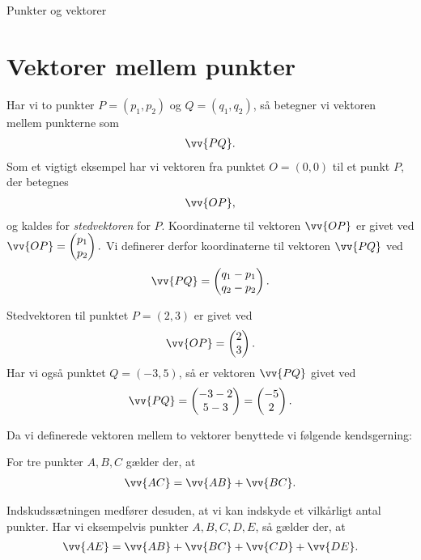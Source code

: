\begin{center}
\Huge
Punkter og vektorer
\end{center}

\section*{Vektorer mellem punkter}
\begin{defn}
Har vi to punkter $P = (p_1,p_2)$ og $Q = (q_1,q_2)$, så betegner vi vektoren mellem punkterne som
\begin{align*}
\vv{PQ}.
\end{align*}
Som et vigtigt eksempel har vi vektoren fra punktet $O = (0,0)$ til et punkt $P$, der betegnes 
\begin{align*}
\vv{OP},
\end{align*}
og kaldes for \textit{stedvektoren} for $P$. 
Koordinaterne til vektoren $\vv{OP}$ er givet ved $\vv{OP} = \begin{pmatrix}
p_1\\p_2
\end{pmatrix}.$ Vi definerer derfor koordinaterne til vektoren $\vv{PQ}$ ved 
\begin{align*}
\vv{PQ} = \begin{pmatrix}
q_1 - p_1\\q_2-p_2
\end{pmatrix}.
\end{align*}
\end{defn}
\begin{exa}
Stedvektoren til punktet $P = (2,3)$ er givet ved 
\begin{align*}
\vv{OP} = \begin{pmatrix}
2\\3
\end{pmatrix}.
\end{align*}
Har vi også punktet $Q = (-3,5)$, så er vektoren $\vv{PQ}$ givet ved
\begin{align*}
\vv{PQ} = \begin{pmatrix}
-3-2\\
5-3
\end{pmatrix} = \begin{pmatrix}
-5\\2
\end{pmatrix}.
\end{align*}
\end{exa}

Da vi definerede vektoren mellem to vektorer benyttede vi følgende kendsgerning:
\begin{setn}[Indskudssætningen]
For tre punkter $A,B,C$ gælder der, at 
\begin{align*}
\vv{AC} = \vv{AB} + \vv{BC}.
\end{align*}
\end{setn}
\begin{exa}
Indskudssætningen medfører desuden, at vi kan indskyde et vilkårligt antal punkter. Har vi eksempelvis punkter $A,B,C,D,E$, så gælder der, at
\begin{align*}
\vv{AE} = \vv{AB} + \vv{BC}+ \vv{CD} + \vv{DE}. 
\end{align*}
\end{exa}

